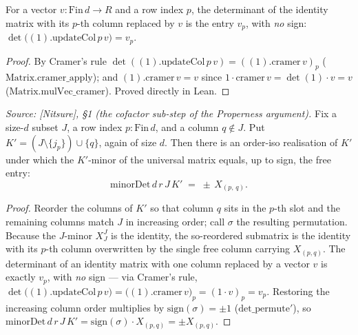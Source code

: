 \begin{lemma}

  \label{lem:gr_det_one_updateCol}
  For a vector \(v : \mathrm{Fin}\,d \to R\) and a row index \(p\), the determinant of the identity
  matrix with its \(p\)-th column replaced by \(v\) is the entry \(v_p\), with \emph{no} sign:
  \(\det\bigl((1).\mathrm{updateCol}\,p\,v\bigr) = v_p\).
\end{lemma}
\begin{proof}

\leanok
  By Cramer's rule \(\det((1).\mathrm{updateCol}\,p\,v) = ((1).\mathrm{cramer}\,v)_p\)
  (\(\mathrm{Matrix.cramer\_apply}\)); and \((1).\mathrm{cramer}\,v = v\) since
  \(\mathrm{1}\cdot\mathrm{cramer}\,v = \det(1)\cdot v = v\) (\(\mathrm{Matrix.mulVec\_cramer}\)).
  Proved directly in Lean.
\end{proof}

\begin{lemma}

  \label{lem:gr_free_entry_eq_signed_minor}
  \textit{Source: [Nitsure], \S 1 (the cofactor sub-step of the Properness argument).}
  Fix a size-\(d\) subset \(J\), a row index \(p : \mathrm{Fin}\,d\), and a column \(q \notin J\). Put
  \(K' = (J \setminus \{j_p\}) \cup \{q\}\), again of size \(d\). Then there is an order-iso realisation of
  \(K'\) under which the \(K'\)-minor of the universal matrix equals, up to sign, the free entry:
  \[
    \mathrm{minorDet}\,d\,r\,J\,K' \;=\; \pm\, X_{(p,\,q)} .
  \]
\end{lemma}
\begin{proof}
  \leanok
  Reorder the columns of \(K'\) so that column \(q\) sits in the \(p\)-th slot and the remaining columns
  match \(J\) in increasing order; call \(\sigma\) the resulting permutation. Because the \(J\)-minor
  \(X^J_J\) is the identity, the so-reordered submatrix is the identity with its \(p\)-th column overwritten
  by the single free column carrying \(X_{(p,q)}\). The determinant of an identity matrix with one column
  replaced by a vector \(v\) is exactly \(v_p\), with \emph{no} sign --- via Cramer's rule,
  \(\det\bigl((1).\mathrm{updateCol}\,p\,v\bigr) = \bigl((1).\mathrm{cramer}\,v\bigr)_p
  = (\mathrm{1}\cdot v)_p = v_p\). Restoring the increasing column order multiplies by \(\mathrm{sign}(\sigma)
  = \pm 1\) (\(\mathrm{det\_permute}'\)), so \(\mathrm{minorDet}\,d\,r\,J\,K' = \mathrm{sign}(\sigma)\cdot
  X_{(p,q)} = \pm X_{(p,q)}\).
\end{proof}

